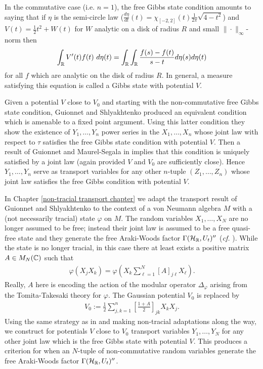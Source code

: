 In the commutative case (i.e. $n=1$), the free Gibbs state condition amounts to saying that if $\eta$ is the semi-circle law ($\frac{d\eta}{dt}(t)=\chi_{[-2,2]}(t) \frac{1}{2\pi}\sqrt{4-t^2}$) and $V(t)=\frac{1}{2} t^2 + W(t)$ for $W$ analytic on a disk of radius $R$ and small $\|\cdot\|_\infty$-norm then
	\begin{align*}
		\int_{\mathbb{R}} V'(t) f(t)\ d\eta(t) = \int_{\mathbb{R}} \int_{\mathbb{R}} \frac{f(s) - f(t)}{s-t} d\eta(s) d\eta(t)
	\end{align*}
for all $f$ which are analytic on the disk of radius $R$. In general, a measure satisfying this equation is called a Gibbs state with potential $V$.

Given a potential $V$ close to $V_0$ and starting with the non-commutative free Gibbs state condition, Guionnet and Shlyakhtenko produced an equivalent condition which is amenable to a fixed point argument. Using this latter condition they show the existence of $Y_1,\ldots, Y_n$ power series in the $X_1,\ldots, X_n$ whose joint law with respect to $\tau$ satisfies the free Gibbs state condition with potential $V$. Then a result of Guionnet and Maurel-Segala in \cite{GM06} implies that this condition is uniquely satisfied by a joint law (again provided $V$ and $V_0$ are sufficiently close). Hence $Y_1,\ldots, Y_n$ serve as transport variables for any other $n$-tuple $(Z_1,\ldots, Z_n)$ whose joint law satisfies the free Gibbs condition with potential $V$.

In Chapter \ref{non-tracial transport chapter} we adapt the transport result of Guionnet and Shlyakhtenko to the context of a von Neumann algebra $M$ with a (not necessarily tracial) state $\varphi$ on $M$. The random variables $X_1,\ldots, X_N$ are no longer assumed to be free; instead their joint law is assumed to be a free quasi-free state and they generate the free Araki-Woods factor $\Gamma(\mathcal{H}_{\mathbb{R}}, U_t)''$ (\emph{cf.} \cite{Shl97}). While the state is no longer tracial, in this case there at least exists a positive matrix $A\in M_N(\mathbb{C})$ such that
	\begin{align*}
		\varphi(X_jX_k) = \varphi\left(X_k \sum_{\ell = 1}^N [A]_{j\ell} X_\ell\right).
	\end{align*}
Really, $A$ here is encoding the action of the modular operator $\Delta_\varphi$ arising from the Tomita-Takesaki theory for $\varphi$. The Gaussian potential $V_0$ is replaced by
	\begin{align*}
		V_0:= \frac{1}{2} \sum_{j,k=1}^n \left[\frac{1+A}{2}\right]_{jk} X_k X_j.
	\end{align*}
Using the same strategy as in \cite{GS14} and making non-tracial adaptations along the way, we construct for potentials $V$ close to $V_0$ transport variables $Y_1,\ldots, Y_N$ for any other joint law which is the free Gibbs state with potential $V$. This produces a criterion for when an $N$-tuple of non-commutative random variables generate the free Araki-Woods factor $\Gamma(\mathcal{H}_{\mathbb{R}},U_t)''$.


